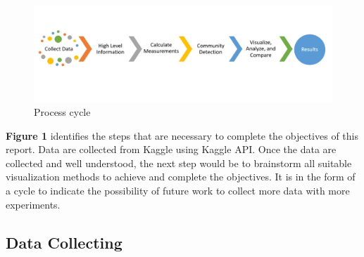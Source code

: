 \documentclass[11pt,twocolumn]{article}
\begin{document}
\begin{figure}[hbt!]
\includegraphics[scale=0.4]{process_flow.PNG} 
\caption{Process cycle}
\end{figure}

\textbf{Figure 1} identifies the steps that are necessary to complete the objectives of this report. Data are collected from Kaggle using Kaggle API. Once the data are collected and well understood, the next step would be to brainstorm all suitable visualization methods to achieve and complete the objectives. It is in the form of a cycle to indicate the possibility of future work to collect more data with more experiments.

\subsection{Data Collecting}
\end{document}
